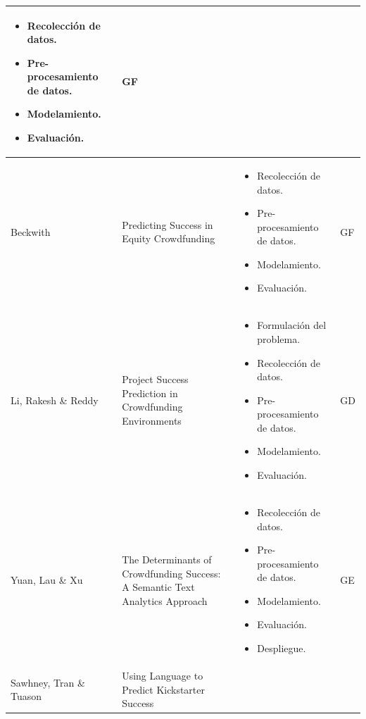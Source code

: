 \begin{longtable}{M{3cm}M{5.5cm}M{5.5cm}M{1.5cm}}
\begin{itemize}[label={--},nosep,noitemsep,leftmargin=*,topsep=0pt,partopsep=0pt]
				\item Recolección de datos.
				\item Pre-procesamiento de datos.
				\item Modelamiento.
				\item Evaluación.
			\end{itemize}
			& GF
			\\
			\hline
			Beckwith
			& Predicting Success in Equity Crowdfunding
			& 
			\begin{itemize}[label={--},nosep,noitemsep,leftmargin=*,topsep=0pt,partopsep=0pt]
				\item Recolección de datos.
				\item Pre-procesamiento de datos.
				\item Modelamiento.
				\item Evaluación.
			\end{itemize}
			&  GF
			\\
			\hline
			Li, Rakesh \& Reddy
			& Project Success Prediction in Crowdfunding Environments
			& 
			\begin{itemize}[label={--},nosep,noitemsep,leftmargin=*,topsep=0pt,partopsep=0pt]
				\item Formulación del problema.
				\item Recolección de datos.
				\item Pre-procesamiento de datos.
				\item Modelamiento.
				\item Evaluación.
			\end{itemize}
			& GD
			\\
			\hline
			Yuan, Lau \& Xu
			& The Determinants of Crowdfunding Success: A Semantic Text Analytics Approach
			& 
			\begin{itemize}[label={--},nosep,noitemsep,leftmargin=*,topsep=0pt,partopsep=0pt]
				\item Recolección de datos.
				\item Pre-procesamiento de datos.
				\item Modelamiento.
				\item Evaluación.
				\item Despliegue.
			\end{itemize}
			& GE
			\\
			\hline
			Sawhney, Tran \& Tuason
			& Using Language to Predict Kickstarter Success
			& 
			\begin{itemize}[label={--},nosep,noitemsep,leftmargin=*,topsep=0pt,partopsep=0pt]

\end{itemize}
\end{longtable}
